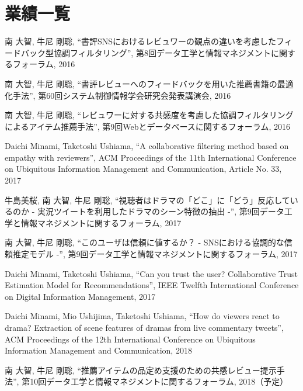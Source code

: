 \documentclass[a4paper,11pt,oneside,openany]{jsbook}
\begin{document}
\chapter*{業績一覧}
\begin{enumerate}[{[}1{]}]
\item 南 大智, 牛尼 剛聡, “書評SNSにおけるレビュワーの観点の違いを考慮したフィードバック型協調フィルタリング”, 第8回データ工学と情報マネジメントに関するフォーラム, 2016
\item 南 大智, 牛尼 剛聡, “書評レビューへのフィードバックを用いた推薦書籍の最適化手法”, 第60回システム制御情報学会研究会発表講演会, 2016
\item 南 大智, 牛尼 剛聡, “レビュワーに対する共感度を考慮した協調フィルタリングによるアイテム推薦手法”, 第9回Webとデータベースに関するフォーラム, 2016
\item Daichi Minami, Taketoshi Ushiama, “A collaborative filtering method based on empathy with reviewers”, ACM Proceedings of the 11th International Conference on Ubiquitous Information Management and Communication, Article No. 33, 2017
\item 牛島美桜, 南 大智, 牛尼 剛聡, “視聴者はドラマの「どこ」に「どう」反応しているのか - 実況ツイートを利用したドラマのシーン特徴の抽出 -”, 第9回データ工学と情報マネジメントに関するフォーラム, 2017
\item 南 大智, 牛尼 剛聡, “このユーザは信頼に値するか？ - SNSにおける協調的な信頼推定モデル -”,  第9回データ工学と情報マネジメントに関するフォーラム, 2017
\item Daichi Minami, Taketoshi Ushiama, “Can you trust the user? Collaborative Trust Estimation Model for Recommendations”, IEEE Twelfth International Conference on Digital Information Management, 2017
\item Daichi Minami, Mio Ushijima, Taketoshi Ushiama, “How do viewers react to drama? Extraction of scene features of dramas from live commentary tweets”, ACM Proceedings of the 12th International Conference on Ubiquitous Information Management and Communication, 2018
\item 南 大智, 牛尼 剛聡, “推薦アイテムの品定め支援のための共感レビュー提示手法”,  第10回データ工学と情報マネジメントに関するフォーラム, 2018（予定）

\end{enumerate}
\end{document}

